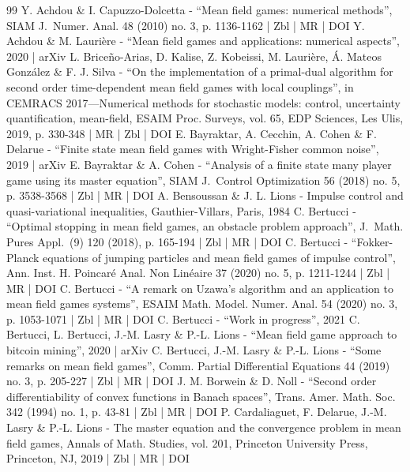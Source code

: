 \begin{thebibliography}{99}
Y. Achdou \& I. Capuzzo-Dolcetta - “Mean field games: numerical methods”, SIAM J. Numer. Anal. 48 (2010) no. 3, p. 1136-1162 | Zbl | MR | DOI
Y. Achdou \& M. Laurière - “Mean field games and applications: numerical aspects”, 2020 | arXiv
L. Briceño-Arias, D. Kalise, Z. Kobeissi, M. Laurière, Á. Mateos González \& F. J. Silva - “On the implementation of a primal-dual algorithm for second order time-dependent mean field games with local couplings”, in CEMRACS 2017—Numerical methods for stochastic models: control, uncertainty quantification, mean-field, ESAIM Proc. Surveys, vol. 65, EDP Sciences, Les Ulis, 2019, p. 330-348 | MR | Zbl | DOI
E. Bayraktar, A. Cecchin, A. Cohen \& F. Delarue - “Finite state mean field games with Wright-Fisher common noise”, 2019 | arXiv
E. Bayraktar \& A. Cohen - “Analysis of a finite state many player game using its master equation”, SIAM J. Control Optimization 56 (2018) no. 5, p. 3538-3568 | Zbl | MR | DOI
A. Bensoussan \& J. L. Lions - Impulse control and quasi-variational inequalities, Gauthier-Villars, Paris, 1984
C. Bertucci - “Optimal stopping in mean field games, an obstacle problem approach”, J. Math. Pures Appl. (9) 120 (2018), p. 165-194 | Zbl | MR | DOI
C. Bertucci - “Fokker-Planck equations of jumping particles and mean field games of impulse control”, Ann. Inst. H. Poincaré Anal. Non Linéaire 37 (2020) no. 5, p. 1211-1244 | Zbl | MR | DOI
C. Bertucci - “A remark on Uzawa’s algorithm and an application to mean field games systems”, ESAIM Math. Model. Numer. Anal. 54 (2020) no. 3, p. 1053-1071 | Zbl | MR | DOI
C. Bertucci - “Work in progress”, 2021
C. Bertucci, L. Bertucci, J.-M. Lasry \& P.-L. Lions - “Mean field game approach to bitcoin mining”, 2020 | arXiv
C. Bertucci, J.-M. Lasry \& P.-L. Lions - “Some remarks on mean field games”, Comm. Partial Differential Equations 44 (2019) no. 3, p. 205-227 | Zbl | MR | DOI
J. M. Borwein \& D. Noll - “Second order differentiability of convex functions in Banach spaces”, Trans. Amer. Math. Soc. 342 (1994) no. 1, p. 43-81 | Zbl | MR | DOI
P. Cardaliaguet, F. Delarue, J.-M. Lasry \& P.-L. Lions - The master equation and the convergence problem in mean field games, Annals of Math. Studies, vol. 201, Princeton University Press, Princeton, NJ, 2019 | Zbl | MR | DOI

\end{thebibliography}
